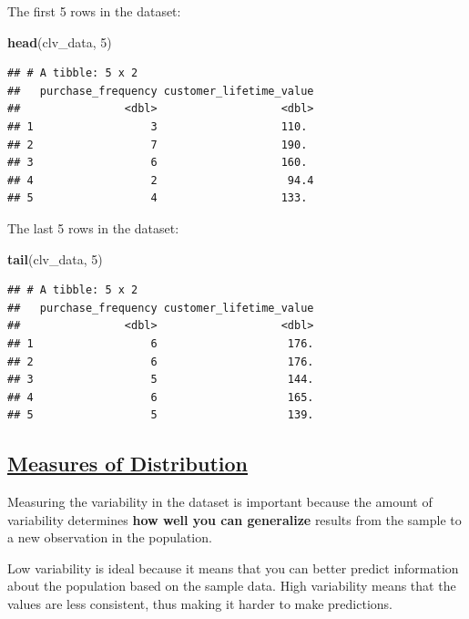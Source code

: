 \documentclass[
]{article}
\newenvironment{Shaded}{\begin{snugshade}}{\end{snugshade}}
\newcommand{\DecValTok}[1]{\textcolor[rgb]{0.00,0.00,0.81}{#1}}
\newcommand{\FunctionTok}[1]{\textcolor[rgb]{0.13,0.29,0.53}{\textbf{#1}}}
\newcommand{\NormalTok}[1]{#1}
\begin{document}
The first 5 rows in the dataset:

\begin{Shaded}
\begin{Highlighting}[]
\FunctionTok{head}\NormalTok{(clv\_data, }\DecValTok{5}\NormalTok{)}
\end{Highlighting}
\end{Shaded}

\begin{verbatim}
## # A tibble: 5 x 2
##   purchase_frequency customer_lifetime_value
##                <dbl>                   <dbl>
## 1                  3                   110. 
## 2                  7                   190. 
## 3                  6                   160. 
## 4                  2                    94.4
## 5                  4                   133.
\end{verbatim}

The last 5 rows in the dataset:

\begin{Shaded}
\begin{Highlighting}[]
\FunctionTok{tail}\NormalTok{(clv\_data, }\DecValTok{5}\NormalTok{)}
\end{Highlighting}
\end{Shaded}

\begin{verbatim}
## # A tibble: 5 x 2
##   purchase_frequency customer_lifetime_value
##                <dbl>                   <dbl>
## 1                  6                    176.
## 2                  6                    176.
## 3                  5                    144.
## 4                  6                    165.
## 5                  5                    139.
\end{verbatim}

\subsection{\texorpdfstring{\ul{\textbf{Measures of
Distribution}}}{Measures of Distribution}}\label{measures-of-distribution}

Measuring the variability in the dataset is important because the amount
of variability determines \textbf{how well you can generalize} results
from the sample to a new observation in the population.

Low variability is ideal because it means that you can better predict
information about the population based on the sample data. High
variability means that the values are less consistent, thus making it
harder to make predictions.
\end{document}
